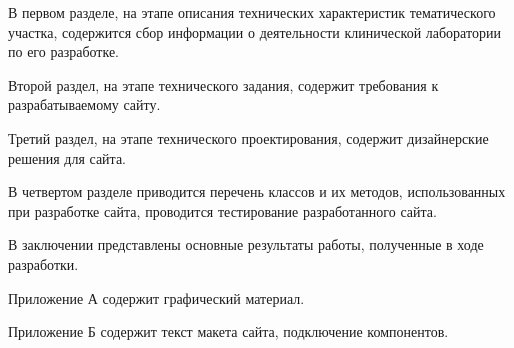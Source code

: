 В первом разделе, на этапе описания технических характеристик тематического участка, содержится сбор информации о деятельности клинической лаборатории по его разработке.

Второй раздел, на этапе технического задания, содержит требования к разрабатываемому сайту.

Третий раздел, на этапе технического проектирования, содержит дизайнерские решения для сайта.

В четвертом разделе приводится перечень классов и их методов, использованных при разработке сайта, проводится тестирование разработанного сайта.

В заключении представлены основные результаты работы, полученные в ходе разработки.

Приложение А содержит графический материал.

Приложение Б содержит текст макета сайта, подключение компонентов. 
